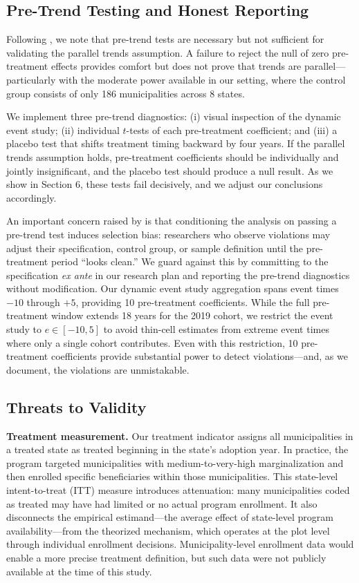 \documentclass[12pt]{article}
\begin{document}
\subsection{Pre-Trend Testing and Honest Reporting}

Following \citet{roth2022pretest}, we note that pre-trend tests are necessary but not sufficient for validating the parallel trends assumption. A failure to reject the null of zero pre-treatment effects provides comfort but does not prove that trends are parallel---particularly with the moderate power available in our setting, where the control group consists of only 186 municipalities across 8 states.

We implement three pre-trend diagnostics: (i) visual inspection of the dynamic event study; (ii) individual $t$-tests of each pre-treatment coefficient; and (iii) a placebo test that shifts treatment timing backward by four years. If the parallel trends assumption holds, pre-treatment coefficients should be individually and jointly insignificant, and the placebo test should produce a null result. As we show in Section 6, these tests fail decisively, and we adjust our conclusions accordingly.

An important concern raised by \citet{roth2022pretest} is that conditioning the analysis on passing a pre-trend test induces selection bias: researchers who observe violations may adjust their specification, control group, or sample definition until the pre-treatment period ``looks clean.'' We guard against this by committing to the specification \textit{ex ante} in our research plan and reporting the pre-trend diagnostics without modification. Our dynamic event study aggregation spans event times $-10$ through $+5$, providing 10 pre-treatment coefficients. While the full pre-treatment window extends 18 years for the 2019 cohort, we restrict the event study to $e \in [-10, 5]$ to avoid thin-cell estimates from extreme event times where only a single cohort contributes. Even with this restriction, 10 pre-treatment coefficients provide substantial power to detect violations---and, as we document, the violations are unmistakable.

\subsection{Threats to Validity}

\textbf{Treatment measurement.} Our treatment indicator assigns all municipalities in a treated state as treated beginning in the state's adoption year. In practice, the program targeted municipalities with medium-to-very-high marginalization and then enrolled specific beneficiaries within those municipalities. This state-level intent-to-treat (ITT) measure introduces attenuation: many municipalities coded as treated may have had limited or no actual program enrollment. It also disconnects the empirical estimand---the average effect of state-level program availability---from the theorized mechanism, which operates at the plot level through individual enrollment decisions. Municipality-level enrollment data would enable a more precise treatment definition, but such data were not publicly available at the time of this study.
\end{document}
